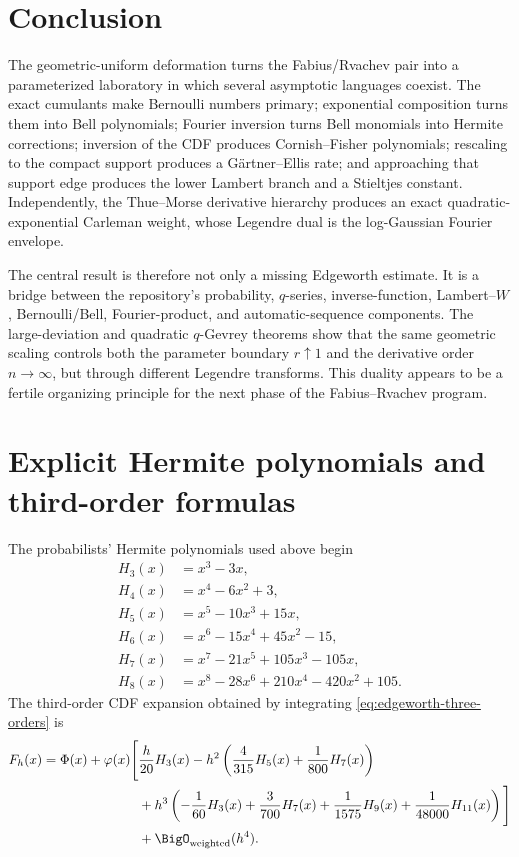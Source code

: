 \documentclass[11pt]{article}
\numberwithin{equation}{section}
\theoremstyle{definition}
\newcommand{\phiN}{\varphi}
\newcommand{\PhiN}{\Phi}
\begin{document}
\section{Conclusion}
The geometric-uniform deformation turns the Fabius/Rvachev pair into a parameterized laboratory in which several asymptotic languages coexist.  The exact cumulants make Bernoulli numbers primary; exponential composition turns them into Bell polynomials; Fourier inversion turns Bell monomials into Hermite corrections; inversion of the CDF produces Cornish--Fisher polynomials; rescaling to the compact support produces a G\"artner--Ellis rate; and approaching that support edge produces the lower Lambert branch and a Stieltjes constant.  Independently, the Thue--Morse derivative hierarchy produces an exact quadratic-exponential Carleman weight, whose Legendre dual is the log-Gaussian Fourier envelope.

The central result is therefore not only a missing Edgeworth estimate.  It is a bridge between the repository's probability, \(q\)-series, inverse-function, Lambert--\(W\), Bernoulli/Bell, Fourier-product, and automatic-sequence components.  The large-deviation and quadratic \(q\)-Gevrey theorems show that the same geometric scaling controls both the parameter boundary \(r\uparrow1\) and the derivative order \(n\to\infty\), but through different Legendre transforms.  This duality appears to be a fertile organizing principle for the next phase of the Fabius--Rvachev program.

\appendix

\section{Explicit Hermite polynomials and third-order formulas}\label{app:hermite}
The probabilists' Hermite polynomials used above begin
\begin{align*}
H_3(x)&=x^3-3x,\\
H_4(x)&=x^4-6x^2+3,\\
H_5(x)&=x^5-10x^3+15x,\\
H_6(x)&=x^6-15x^4+45x^2-15,\\
H_7(x)&=x^7-21x^5+105x^3-105x,\\
H_8(x)&=x^8-28x^6+210x^4-420x^2+105.
\end{align*}
The third-order CDF expansion obtained by integrating \eqref{eq:edgeworth-three-orders} is
\begin{align}\label{eq:cdf-third-order}
F_h(x)=\PhiN(x)+\phiN(x)\Bigg[&\frac h{20}H_3(x)
-h^2\left(\frac4{315}H_5(x)+\frac1{800}H_7(x)\right)\notag\\
&+h^3\left(-\frac1{60}H_3(x)+\frac3{700}H_7(x)
+\frac1{1575}H_9(x)+\frac1{48000}H_{11}(x)\right)\Bigg]\notag\\
&+\BigO_{\mathrm{weighted}}(h^4).
\end{align}
\end{document}
